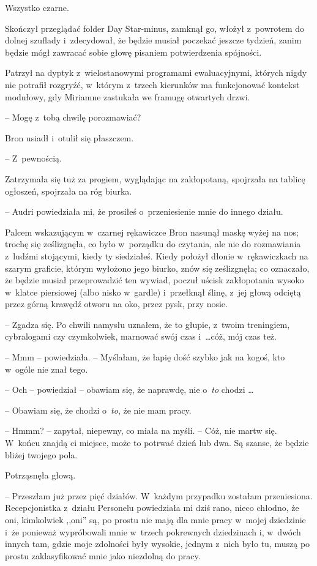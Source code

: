 \documentclass[oneside,polish,11pt,rmheadings]{mwbk}
\begin{document}
Wszystko czarne. 

Skończył przeglądać folder Day Star-minus, zamknął go, włożył z~powrotem do dolnej szuflady i~zdecydował, że będzie musiał poczekać jeszcze tydzień, zanim będzie mógł zawracać sobie głowę pisaniem potwierdzenia spójności. 

Patrzył na dyptyk z~wielostanowymi programami ewaluacyjnymi, których nigdy nie potrafił rozgryźć, w~którym z~trzech kierunków ma funkcjonować kontekst modułowy, gdy Miriamne zastukała we framugę otwartych drzwi. 

-- Mogę z~tobą chwilę porozmawiać? 

Bron usiadł i~otulił się płaszczem. 

-- Z~pewnością. 

Zatrzymała się tuż za progiem, wyglądając na zakłopotaną, spojrzała na tablicę ogłoszeń, spojrzała na róg biurka. 

-- Audri powiedziała mi, że prosiłeś o~przeniesienie mnie do innego działu. 

Palcem wskazującym w~czarnej rękawiczce Bron nasunął maskę wyżej na nos; trochę się ześlizgnęła, co było w~porządku do czytania, ale nie do rozmawiania z~ludźmi stojącymi, kiedy ty siedziałeś. Kiedy położył dłonie w~rękawiczkach na szarym graficie, którym wyłożono jego biurko, znów się ześlizgnęła; co oznaczało, że będzie musiał przeprowadzić ten wywiad, poczuł uścisk zakłopotania wysoko w~klatce piersiowej (albo nisko w~gardle) i~przełknął ślinę, z~jej głową odciętą przez górną krawędź otworu na oko, przez pysk, przy nosie.  

-- Zgadza się. Po chwili namysłu uznałem, że to głupie, z~twoim treningiem, cybralogami czy czymkolwiek, marnować swój czas i~\ldots  cóż, mój czas też. 

-- Mmm -- powiedziała. -- Myślałam, że łapię dość szybko jak na kogoś, kto w~ogóle nie znał tego. 

-- Och -- powiedział – obawiam się, że naprawdę, nie o~\textit{to }chodzi \ldots  

-- Obawiam się, że chodzi o~\textit{to}, że nie mam pracy. 

-- Hmmm? -- zapytał, niepewny, co miała na myśli. -- Cóż, nie martw się. W~końcu znajdą ci miejsce, może to potrwać dzień lub dwa. Są szanse, że będzie bliżej twojego pola. 

Potrząsnęła głową. 

-- Przeszłam już przez pięć działów. W~każdym przypadku zostałam przeniesiona. Recepcjonistka z~działu Personelu powiedziała mi dziś rano, nieco chłodno, że oni, kimkolwiek ,,oni'' są, po prostu nie mają dla mnie pracy w~mojej dziedzinie i~że ponieważ wypróbowali mnie w~trzech pokrewnych dziedzinach i, w~dwóch innych tam, gdzie moje zdolności były wysokie, jednym z~nich było tu, muszą po prostu zaklasyfikować mnie jako niezdolną do pracy. 
\end{document}
